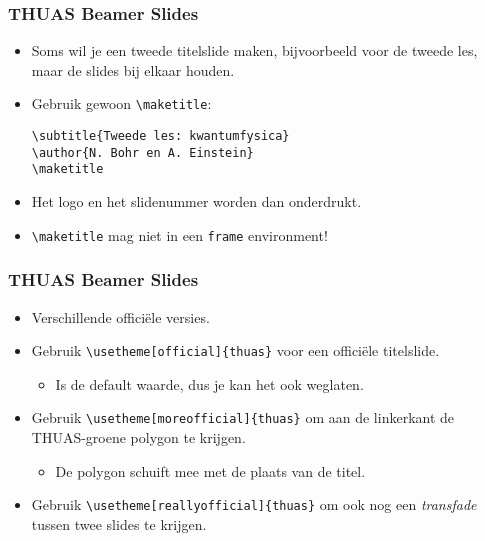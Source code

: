 \documentclass[fleqn,aspectratio=169,dutch,10pt]{beamer}
\begin{document}
\beamerthemethuaslogotrue


\begin{frame}[fragile]
\frametitle{THUAS Beamer Slides}
\begin{itemize}
\item Soms wil je een tweede titelslide maken, bijvoorbeeld voor de tweede les, maar de slides bij elkaar houden.
\item Gebruik gewoon \lstinline|\maketitle|:
\begin{lstlisting}
\subtitle{Tweede les: kwantumfysica}
\author{N. Bohr en A. Einstein}
\maketitle
\end{lstlisting}
\item Het logo en het slidenummer worden dan onderdrukt.
\item \lstinline|\maketitle| mag niet in een \lstinline|frame| environment!
\end{itemize}
\end{frame}


\begin{frame}[fragile]
\frametitle{THUAS Beamer Slides}
\begin{itemize}
\item Verschillende offici\"ele versies.
\item Gebruik \lstinline|\usetheme[official]{thuas}| voor een offici\"ele titelslide.
\begin{itemize}
\item Is de default waarde, dus je kan het ook weglaten.
\end{itemize}
\item Gebruik \lstinline|\usetheme[moreofficial]{thuas}| om aan de linkerkant de THUAS-groene polygon te krijgen.
\begin{itemize}
\item De polygon schuift mee met de plaats van de titel.
\end{itemize}
\item Gebruik \lstinline|\usetheme[reallyofficial]{thuas}| om ook nog een \textsl{transfade} tussen twee slides te krijgen.
\end{itemize}
\end{frame}
\end{document}
